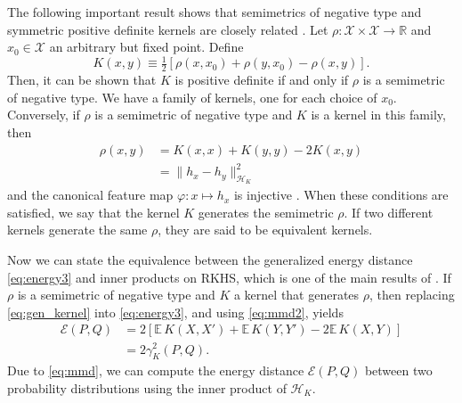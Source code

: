 \documentclass[10pt,journal,compsoc]{IEEEtran}
\newcommand\Energy{\mathcal{E}}
\newcommand\E{\mathbb{E}}
\newcommand\kk{K}
\newcommand\kkk{h}
\newcommand\Hk{{\mathcal{H}}_{\kk}}
\begin{document}
The following important result shows that semimetrics of negative
type and symmetric positive definite kernels are closely related
\cite{Berg1984}. Let $\rho: \mathcal{X} \times \mathcal{X} \to \mathbb{R}$
and $x_0 \in \mathcal{X}$ an arbitrary but fixed point.
Define
\begin{equation}
\label{eq:kernel_semimetric}
\kk(x,y) \equiv 
\tfrac{1}{2} \left[  \rho(x,x_0) + \rho(y,x_0) - \rho(x,y)\right].
\end{equation}
Then, it can be shown that 
$\kk$ is positive definite if and only if $\rho$ is a semimetric
of negative type.
We have a family of kernels, one for each choice of $x_0$. Conversely,
if $\rho$ is a semimetric of negative type and $\kk$ is a kernel in this
family, then 
\begin{equation}
\label{eq:gen_kernel}
\begin{split}
\rho(x,y) &= \kk(x,x) + \kk(y,y) -2\kk(x,y) \\
&=  \| \kkk_x - \kkk_y \|^2_{\Hk}
\end{split}
\end{equation}
and the canonical feature map 
$\varphi: x \mapsto \kkk_x$ is injective \cite{Sejdinovic2013}.
When these conditions are satisfied, we say that the kernel $\kk$ 
generates the semimetric $\rho$. 
If two different kernels generate the same $\rho$, they are
said to be equivalent kernels.

Now we can state the equivalence between the generalized 
energy distance \eqref{eq:energy3} and
inner products on RKHS, which is one of the main results of
\cite{Sejdinovic2013}. If $\rho$ is a semimetric
of negative type and $\kk$ a kernel that generates $\rho$, then
replacing \eqref{eq:gen_kernel} into
\eqref{eq:energy3}, and using \eqref{eq:mmd2}, yields
\begin{equation} \label{eq:Erho}
\begin{split}
\Energy(P, Q) &= 
2 \left[ \E \, \kk(X, X') + \E \, \kk(Y, Y') - 2\E \, \kk(X, Y)\right]  \\
&= 2 \gamma_\kk^2(P,Q) .
\end{split}
\end{equation}
Due to \eqref{eq:mmd}, we can compute the energy 
distance $\mathcal{E}(P, Q)$ between two probability distributions
using the inner 
product of $\Hk$. 
\end{document}

